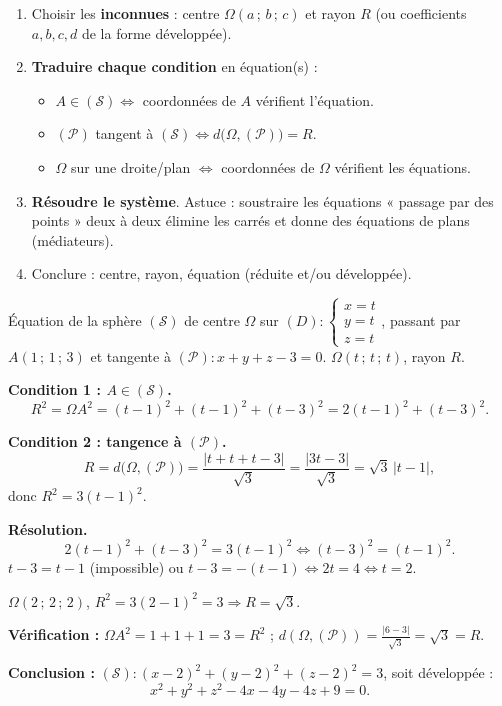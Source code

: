 \documentclass[11pt]{article}
\begin{document}
\begin{methode}
\begin{enumerate}
\item Choisir les \textbf{inconnues} : centre $\Omega(a\,;\,b\,;\,c)$ et rayon $R$ (ou coefficients $a,b,c,d$ de la forme développée).
\item \textbf{Traduire chaque condition} en équation(s) :
\begin{itemize}
\item $A\in(\mathcal{S}) \iff$ coordonnées de $A$ vérifient l'équation.
\item $(\mathcal{P})$ tangent à $(\mathcal{S}) \iff d\big(\Omega,(\mathcal{P})\big)=R$.
\item $\Omega$ sur une droite/plan $\iff$ coordonnées de $\Omega$ vérifient les équations.
\end{itemize}
\item \textbf{Résoudre le système}. Astuce : soustraire les équations « passage par des points » deux à deux élimine les carrés et donne des équations de plans (médiateurs).
\item Conclure : centre, rayon, équation (réduite et/ou développée).
\end{enumerate}
\end{methode}

\begin{exoresolu}
Équation de la sphère $(\mathcal{S})$ de centre $\Omega$ sur $(D) : \begin{cases} x=t \\ y=t \\ z=t \end{cases}$, passant par $A(1\,;\,1\,;\,3)$ et tangente à $(\mathcal{P}) : x+y+z-3=0$.
\tcblower
$\Omega(t\,;\,t\,;\,t)$, rayon $R$.

\textbf{Condition 1 : $A\in(\mathcal{S})$.}
\[ R^2 = \Omega A^2 = (t-1)^2+(t-1)^2+(t-3)^2 = 2(t-1)^2+(t-3)^2. \]

\textbf{Condition 2 : tangence à $(\mathcal{P})$.}
\[ R = d\big(\Omega,(\mathcal{P})\big) = \frac{|t+t+t-3|}{\sqrt{3}} = \frac{|3t-3|}{\sqrt{3}} = \sqrt{3}\,|t-1|, \]
donc $R^2 = 3(t-1)^2$.

\textbf{Résolution.}
\[ 2(t-1)^2+(t-3)^2 = 3(t-1)^2 \iff (t-3)^2 = (t-1)^2. \]
$t-3=t-1$ (impossible) ou $t-3=-(t-1) \iff 2t=4 \iff t=2$.

$\Omega(2\,;\,2\,;\,2)$, $R^2=3(2-1)^2=3 \Rightarrow R=\sqrt{3}$.

\textbf{Vérification :} $\Omega A^2=1+1+1=3=R^2$ ; $d(\Omega,(\mathcal{P}))=\frac{|6-3|}{\sqrt{3}}=\sqrt{3}=R$.

\textbf{Conclusion :} $(\mathcal{S}) : (x-2)^2+(y-2)^2+(z-2)^2=3$, soit développée :
\[ \boxed{x^2+y^2+z^2-4x-4y-4z+9=0.} \]
\end{exoresolu}
\end{document}

